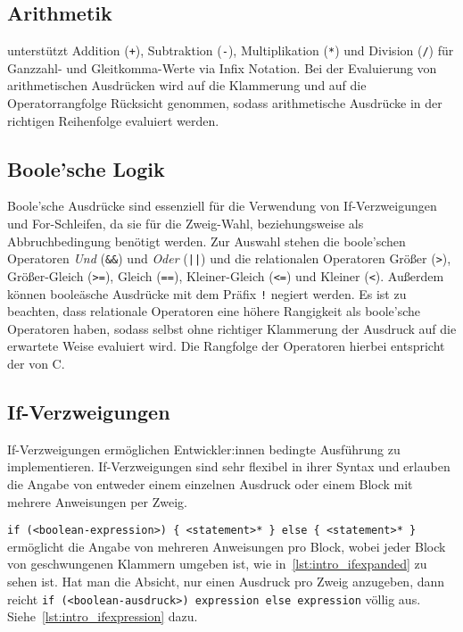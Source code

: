 \subsection{Arithmetik}

\Toya unterstützt Addition (\texttt{+}), Subtraktion (\texttt{-}), Multiplikation (\texttt{*}) und Division (\texttt{/}) für Ganzzahl- und Gleitkomma-Werte via Infix Notation. Bei der Evaluierung von arithmetischen Ausdrücken wird auf die Klammerung und auf die Operatorrangfolge Rücksicht genommen, sodass arithmetische Ausdrücke in der richtigen Reihenfolge evaluiert werden. 


\subsection{Boole'sche Logik}

Boole'sche Ausdrücke sind essenziell für die Verwendung von If-Verzweigungen und For-Schleifen, da sie für die Zweig-Wahl, beziehungsweise als Abbruchbedingung benötigt werden. Zur Auswahl stehen die boole'schen Operatoren \textit{Und} (\texttt{\&\&}) und \textit{Oder} (\texttt{||}) und die relationalen Operatoren Größer (\texttt{>}), Größer-Gleich (\texttt{>=}), Gleich (\texttt{==}), Kleiner-Gleich (\texttt{<=}) und Kleiner (\texttt{<}). Außerdem können booleäsche Ausdrücke mit dem Präfix \texttt{!} negiert werden. Es ist zu beachten, dass relationale Operatoren eine höhere Rangigkeit als boole'sche Operatoren haben, sodass selbst ohne richtiger Klammerung der Ausdruck auf die erwartete Weise evaluiert wird. Die Rangfolge der Operatoren hierbei entspricht der von C.


\subsection{If-Verzweigungen}

If-Verzweigungen ermöglichen Entwickler:innen bedingte Ausführung zu implementieren. If-Verzweigungen sind sehr flexibel in ihrer Syntax und erlauben die Angabe von entweder einem einzelnen Ausdruck oder einem Block mit mehrere Anweisungen per Zweig.

\texttt{if (<boolean-expression>) \{ <statement>* \} else \{ <statement>* \}} ermöglicht die Angabe von mehreren Anweisungen pro Block, wobei jeder Block von geschwungenen Klammern umgeben ist, wie in~\autoref{lst:intro_ifexpanded} zu sehen ist. Hat man die Absicht, nur einen Ausdruck pro Zweig anzugeben, dann reicht \texttt{if (<boolean-ausdruck>) expression else expression} völlig aus. Siehe~\autoref{lst:intro_ifexpression} dazu.

